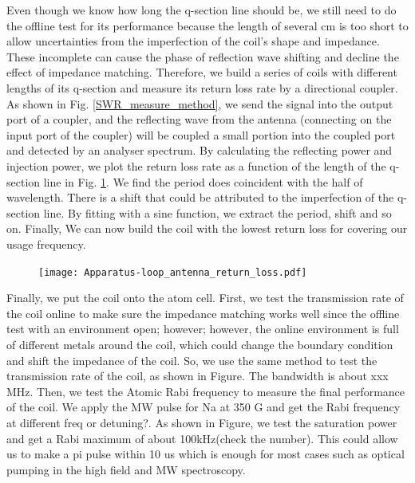 Even though we know how long the q-section line should be, we still need to do the offline test for its performance because the length of several cm is too short to allow uncertainties from the imperfection of the coil's shape and impedance. These incomplete can cause the phase of reflection wave shifting and decline the effect of impedance matching. Therefore, we build a series of coils with different lengths of its q-section and measure its return loss rate by a directional coupler. As shown in Fig. \ref{SWR_measure_method}, we send the signal into the output port of a coupler, and the reflecting wave from the antenna (connecting on the input port of the coupler) will be coupled a small portion into the coupled port and detected by an analyser spectrum. By calculating the reflecting power and injection power, we plot the return loss rate as a function of the length of the q-section line in Fig. \ref{antenna_return_loss}. We find the period does coincident with the half of wavelength. There is a shift that could be attributed to the imperfection of the q-section line. By fitting with a sine function, we extract the period, shift and so on. Finally, We can now build the coil with the lowest return loss for covering our usage frequency.

\begin{figure}[htb]
\begin{center}
\texttt{[image: Apparatus-loop\_antenna\_return\_loss.pdf]}
\end{center}
\caption[]{}  
\label{antenna_return_loss}
\end{figure}

Finally, we put the coil onto the atom cell. First, we test the transmission rate of the coil online to make sure the impedance matching works well since the offline test with an environment open; however; however, the online environment is full of different metals around the coil, which could change the boundary condition and shift the impedance of the coil. So, we use the same method to test the transmission rate of the coil, as shown in Figure. The bandwidth is about xxx MHz. Then, we test the Atomic Rabi frequency to measure the final performance of the coil. We apply the MW pulse for Na at 350 G and get the Rabi frequency at different freq or detuning?. As shown in Figure, we test the saturation power and get a Rabi maximum of about 100kHz(check the number). This could allow us to make a pi pulse within 10 us which is enough for most cases such as optical pumping in the high field and MW spectroscopy.

